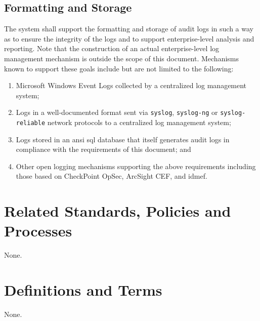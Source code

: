 \subsection{Formatting and Storage}
The system shall support the formatting and storage of audit logs in such a way as to ensure the integrity of the logs and to support enterprise-level analysis and reporting.  
Note that the construction of an actual enterprise-level log management mechanism is outside the scope of this document.  
Mechanisms known to support these goals include but are not limited to the following:
\begin{enumerate}
\item
Microsoft Windows Event Logs collected by a centralized log management system;
\item
Logs in a well-documented format sent via \texttt{syslog}, \texttt{syslog-ng}\oxford{} or \texttt{syslog-reliable} network protocols to a centralized log management system;
\item
Logs stored in an \gls{ansi} \gls{sql} database that itself generates audit logs in compliance with the requirements of this document; and
\item
Other open logging mechanisms supporting the above requirements including those based on CheckPoint OpSec, ArcSight CEF, and \gls{idmef}.
\end{enumerate}
\CommonPolicyCompliance
\section{Related Standards, Policies\oxford{} and Processes}
None.
\section{Definitions and Terms}
None.
\CommonRevisionHistory